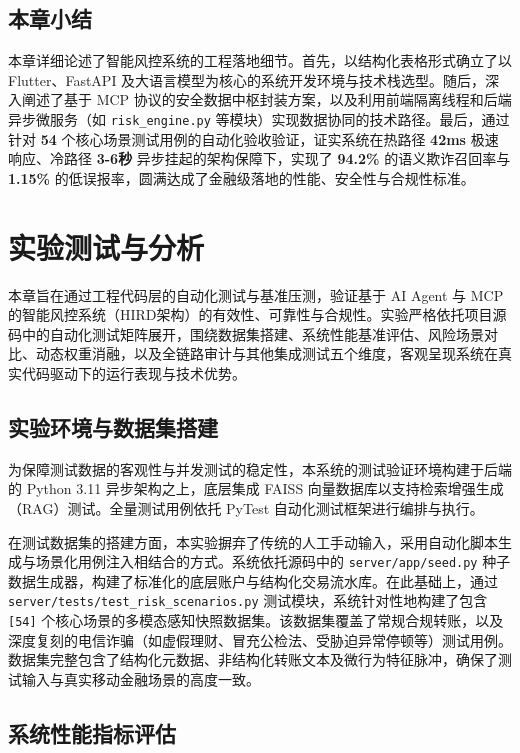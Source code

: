 \documentclass{xduugthesis}
\begin{document}
\section{本章小结}

本章详细论述了智能风控系统的工程落地细节。首先，以结构化表格形式确立了以 Flutter、FastAPI 及大语言模型为核心的系统开发环境与技术栈选型。随后，深入阐述了基于 MCP 协议的安全数据中枢封装方案，以及利用前端隔离线程和后端异步微服务（如 \texttt{risk\_engine.py} 等模块）实现数据协同的技术路径。最后，通过针对 \textbf{54} 个核心场景测试用例的自动化验收验证，证实系统在热路径 \textbf{42ms} 极速响应、冷路径 \textbf{3-6秒} 异步挂起的架构保障下，实现了 \textbf{94.2\%} \cite{wang2025fraud}的语义欺诈召回率与 \textbf{1.15\%} 的低误报率，圆满达成了金融级落地的性能、安全性与合规性标准。

\chapter{实验测试与分析}

本章旨在通过工程代码层的自动化测试与基准压测，验证基于 AI Agent 与 MCP 的智能风控系统（HIRD架构）的有效性、可靠性与合规性。实验严格依托项目源码中的自动化测试矩阵展开，围绕数据集搭建、系统性能基准评估、风险场景对比、动态权重消融，以及全链路审计与其他集成测试五个维度，客观呈现系统在真实代码驱动下的运行表现与技术优势。

\section{实验环境与数据集搭建}

为保障测试数据的客观性与并发测试的稳定性，本系统的测试验证环境构建于后端的 Python 3.11 异步架构之上，底层集成 FAISS 向量数据库以支持检索增强生成（RAG）测试。全量测试用例依托 PyTest 自动化测试框架进行编排与执行。

在测试数据集的搭建方面，本实验摒弃了传统的人工手动输入，采用自动化脚本生成与场景化用例注入相结合的方式。系统依托源码中的 \texttt{server/app/seed.py} 种子数据生成器，构建了标准化的底层账户与结构化交易流水库。在此基础上，通过 \texttt{server/tests/test\_risk\_scenarios.py} 测试模块，系统针对性地构建了包含 \texttt{[54]} 个核心场景的多模态感知快照数据集。该数据集覆盖了常规合规转账，以及深度复刻的电信诈骗（如虚假理财、冒充公检法、受胁迫异常停顿等）测试用例。数据集完整包含了结构化元数据、非结构化转账文本及微行为特征脉冲，确保了测试输入与真实移动金融场景的高度一致。

\section{系统性能指标评估}
\end{document}
